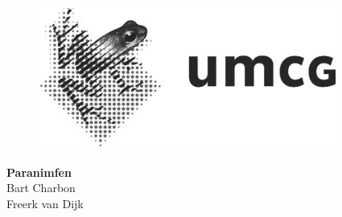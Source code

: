 \begin{figure}[!htbp]
  \centering
  \begin{minipage}[b]{0.19\textwidth}
  \end{minipage}
  \hfill
  \begin{minipage}[b]{0.24\textwidth}
    \includegraphics[width=\textwidth]{img/colofon_umcg_zw}
  \end{minipage}
  \hfill
  \begin{minipage}[b]{0.29\textwidth}
  \end{minipage}
  \hfill
  \begin{minipage}[b]{0.23\textwidth}
  \end{minipage}
\end{figure}

\clearpage



\clearpage

\noindent
\textbf{Paranimfen}\\
Bart Charbon\\
Freerk van Dijk\\
